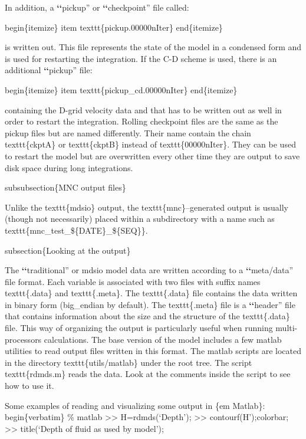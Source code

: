 \documentclass[letterpaper,10pt,english]{sphinxmanual}
\begin{document}
In addition, a {\color{red}\bfseries{}{}`{}`}pickup'' or {\color{red}\bfseries{}{}`{}`}checkpoint'' file called:

begin\{itemize\}
item texttt\{pickup.00000nIter\}
end\{itemize\}

is written out. This file represents the state of the model in a condensed
form and is used for restarting the integration. If the C-D scheme is used,
there is an additional {\color{red}\bfseries{}{}`{}`}pickup'' file:

begin\{itemize\}
item texttt\{pickup\_cd.00000nIter\}
end\{itemize\}

containing the D-grid velocity data and that has to be written out as well
in order to restart the integration. Rolling checkpoint files are the same
as the pickup files but are named differently. Their name contain the chain
texttt\{ckptA\} or texttt\{ckptB\} instead of texttt\{00000nIter\}. They can be
used to restart the model but are overwritten every other time they are
output to save disk space during long integrations.

subsubsection\{MNC output files\}

Unlike the texttt\{mdsio\} output, the texttt\{mnc\}--generated output
is usually (though not necessarily) placed within a subdirectory with
a name such as texttt\{mnc\_test\_\$\{DATE\}\_\$\{SEQ\}\}.

subsection\{Looking at the output\}

The {\color{red}\bfseries{}{}`{}`}traditional'' or mdsio model data are written according to a
{\color{red}\bfseries{}{}`{}`}meta/data'' file format.  Each variable is associated with two files
with suffix names texttt\{.data\} and texttt\{.meta\}. The
texttt\{.data\} file contains the data written in binary form
(big\_endian by default). The texttt\{.meta\} file is a {\color{red}\bfseries{}{}`{}`}header'' file
that contains information about the size and the structure of the
texttt\{.data\} file. This way of organizing the output is particularly
useful when running multi-processors calculations. The base version of
the model includes a few matlab utilities to read output files written
in this format. The matlab scripts are located in the directory
texttt\{utils/matlab\} under the root tree. The script texttt\{rdmds.m\}
reads the data. Look at the comments inside the script to see how to
use it.

Some examples of reading and visualizing some output in \{em Matlab\}:
begin\{verbatim\}
\% matlab
\textgreater{}\textgreater{} H=rdmds(`Depth');
\textgreater{}\textgreater{} contourf(H');colorbar;
\textgreater{}\textgreater{} title(`Depth of fluid as used by model');
\end{document}
